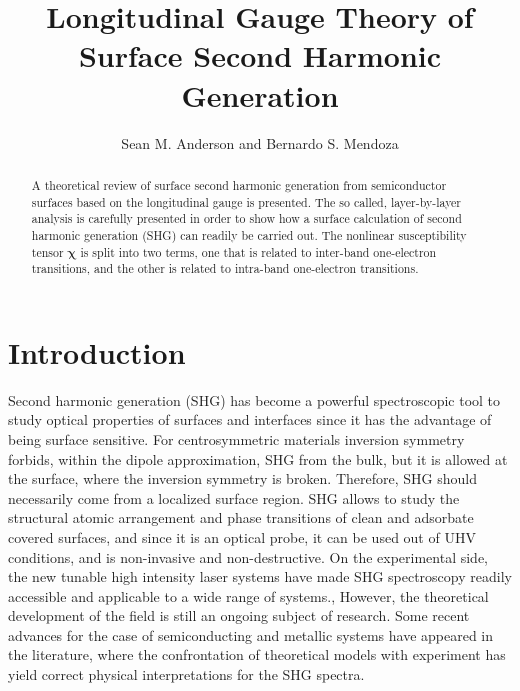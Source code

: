\documentclass[floatfix,prb,aps,superscriptaddress,11pt,preprint]{revtex4}
\begin{document}
\title{Longitudinal Gauge Theory of Surface Second Harmonic Generation}
\author{Sean M. Anderson and Bernardo S. Mendoza}

 \begin{abstract}
 A theoretical review of surface second harmonic generation from
 semiconductor surfaces based on the longitudinal gauge is
 presented. The so called, layer-by-layer analysis is carefully
 presented in order to show how a surface calculation of second
 harmonic generation (SHG) can readily be carried out. The nonlinear
 susceptibility tensor $\boldsymbol{\chi}$ is split into two terms,
 one that is related to inter-band one-electron transitions, and the
 other is related to intra-band one-electron transitions. 

% 
\end{abstract}  

\maketitle
\tableofcontents

\section{Introduction}\label{intro}

Second harmonic generation (SHG) has become a powerful spectroscopic
tool to study optical properties of surfaces and interfaces since it
has the advantage of being surface sensitive. For centrosymmetric
materials inversion symmetry forbids, within the dipole approximation,
SHG from the bulk, but it is allowed at the surface, where the
inversion symmetry is broken. Therefore, SHG should necessarily come
from a localized surface region. SHG allows to study the structural
atomic arrangement and phase transitions of clean and adsorbate
covered surfaces, and since it is an optical probe, it can be used out
of UHV conditions, and is non-invasive and non-destructive. On the
experimental side, the new tunable high intensity laser systems have
made SHG spectroscopy readily accessible and applicable to a wide
range of
systems.\cite{downer_optical_2001},\cite{lupke_characterization_1999}
However, the theoretical development of the field is still an ongoing
subject of research. Some recent advances for the case of
semiconducting and metallic systems have appeared in the literature,
where the confrontation of theoretical 
models with experiment has yield correct physical interpretations for
the SHG
spectra.\cite{downer_optical_2001,mendoza_ab_2001,lim_optical_2000,gavrilenko_optical_2000,mendoza_visible-infrared_1999,mendoza_microscopic_1998,mendoza_local-field_1996,mendoza_polarizable-bond_1997,guyot-sionnest_electronic_1990} 
\end{document}
